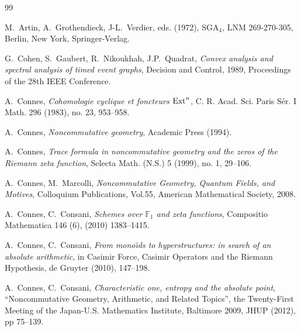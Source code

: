 \documentclass[noams,lp]{compositio}
\def\F{{\mathbb F}}
\begin{document}
\begin{thebibliography}{99}


 M.~Artin, A.~Grothendieck, J-L.~Verdier, eds. (1972), SGA$_4$,  LNM 269-270-305, Berlin, New York, Springer-Verlag.

 G.~Cohen, S.~Gaubert, R.~Nikoukhah, J.P.~Quadrat,  {\em Convex analysis and spectral analysis of timed event graphs}, Decision and Control, 1989, Proceedings of the 28th IEEE Conference.




 A.~Connes, {\em  Cohomologie cyclique et foncteurs ${\rm Ext}\sp n$},  C. R. Acad. Sci. Paris S\'er. I Math. 296 (1983), no. 23, 953--958.

 A.~Connes, {\em Noncommutative  geometry},
 Academic Press (1994).

 A.~Connes, {\em Trace formula in noncommutative geometry and the zeros of the Riemann zeta function},  Selecta Math. (N.S.)  5  (1999),  no. 1, 29--106.

 A.~Connes, M.~Marcolli,  {\em  Noncommutative Geometry, Quantum Fields, and Motives},
Colloquium Publications, Vol.55, American Mathematical Society, 2008.

 A.~Connes, C.~Consani, {\em Schemes over $\F_1$ and zeta functions}, Compositio Mathematica
146 (6), (2010) 1383--1415.

 A.~Connes, C.~Consani, {\em From mono\"{\i}ds to hyperstructures: in search of an absolute arithmetic}, in Casimir Force, Casimir Operators and the Riemann Hypothesis, de Gruyter
(2010), 147--198.

  A.~Connes, C.~Consani,  {\em Characteristic one, entropy and the absolute point}, ``Noncommutative Geometry, Arithmetic, and Related Topics'', the Twenty-First Meeting of the Japan-U.S. Mathematics Institute, Baltimore 2009, JHUP (2012), pp 75--139.





\end{thebibliography}
\end{document}
